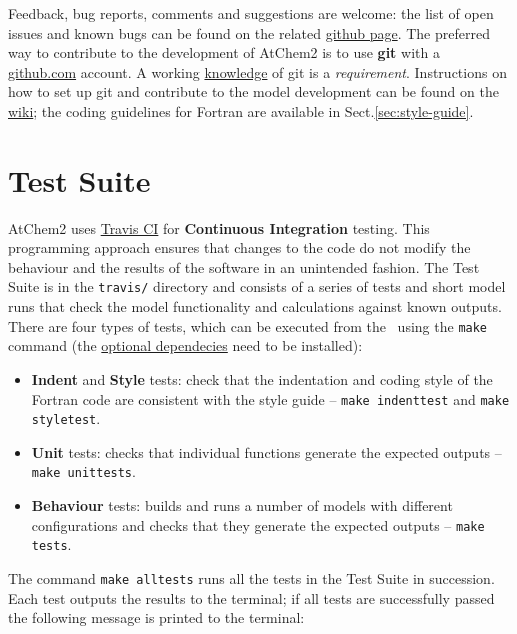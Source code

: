 Feedback, bug reports, comments and suggestions are welcome: the list
of open issues and known bugs can be found on the related
\href{https://github.com/AtChem/AtChem2/issues}{github page}. The
preferred way to contribute to the development of AtChem2 is to use
\textbf{git} with a \href{https://github.com}{github.com} account. A
working \href{https://swcarpentry.github.io/git-novice/}{knowledge} of
git is a \emph{requirement}. Instructions on how to set up git and
contribute to the model development can be found on the
\href{https://github.com/AtChem/AtChem2/wiki/How-to-contribute}{wiki}; the
coding guidelines for Fortran are available in Sect.\ref{sec:style-guide}.

\section{Test Suite} \label{sec:test-suite}

AtChem2 uses \href{https://travis-ci.org/}{Travis CI} for
\textbf{Continuous Integration} testing. This programming approach
ensures that changes to the code do not modify the behaviour and the
results of the software in an unintended fashion. The Test Suite is in
the \texttt{travis/} directory and consists of a series of tests and
short model runs that check the model functionality and calculations
against known outputs. There are four types of tests, which can be
executed from the \maindir\ using the \verb|make| command (the
\hyperref[subsec:optional-dependencies]{optional dependecies} need to
be installed):

\begin{itemize}
\item \textbf{Indent} and \textbf{Style} tests: check that the
  indentation and coding style of the Fortran code are consistent with
  the style guide -- \verb|make indenttest| and \verb|make styletest|.
\item \textbf{Unit} tests: checks that individual functions generate
  the expected outputs -- \verb|make unittests|.
\item \textbf{Behaviour} tests: builds and runs a number of models
  with different configurations and checks that they generate the
  expected outputs -- \verb|make tests|.
\end{itemize}

The command \verb|make alltests| runs all the tests in the Test Suite
in succession. Each test outputs the results to the terminal; if all
tests are successfully passed the following message is printed to the
terminal:


